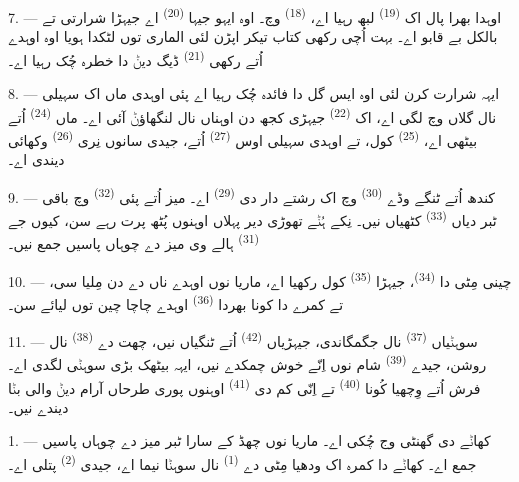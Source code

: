 \VUsaut{5.0mm}
\VUsaut{3.0mm}

7. --- اوہدا بھرا پال اک  \textsuperscript{(19)} لبھ رہیا اے،
 \textsuperscript{(18)} وچ۔ اوہ ایہو جیہا 
\textsuperscript{(20)} اے جیہڑا شرارتی تے بالکل بے قابو اے۔ بہت اُچی رکھی کتاب تیکر
اپڑن لئی الماری توں لٹکدا ہویا اوہ اوہدے اُتے رکھی 
\textsuperscript{(21)} ڈیگ دیݨ دا خطرہ چُک رہیا اے۔

8. --- ایہہ شرارت کرن لئی اوہ ایس گل دا فائدہ چُک رہیا اے پئی اوہدی ماں اک سہیلی
نال گلاں وچ لگی اے، اک  \textsuperscript{(22)} جیہڑی کجھ دن اوہناں نال
لنگھاؤݨ آئی اے۔ ماں  \textsuperscript{(24)} اُتے بیٹھی اے،
 \textsuperscript{(25)} کول، تے اوہدی سہیلی اوس 
\textsuperscript{(27)} اُتے، جیدی سانوں نِری  \textsuperscript{(26)}
وکھائی دیندی اے۔

9. --- کندھ اُتے ٹنگے وڈے  \textsuperscript{(30)} وچ اک رشتے دار دی
 \textsuperscript{(29)} اے۔ میز اُتے پئی 
\textsuperscript{(32)} وچ باقی ٹبر دیاں  \textsuperscript{(33)}
کٹھیاں نیں۔ نِکے ہُݨے تھوڑی دیر پہلاں اوہنوں پُٹھ پرت رہے سن، کیوں جے
 \textsuperscript{(31)} ہالے وی میز دے چوہاں پاسیں جمع نیں۔

10. --- چینی مِٹی دا  \textsuperscript{(34)}، جیہڑا
 \textsuperscript{(35)} کول رکھیا اے، ماریا نوں اوہدے ناں
دے دن مِلیا سی، تے کمرے دا کونا بھردا 
\textsuperscript{(36)} اوہدے چاچا چین توں لیائے سن۔

11. --- سوہݨیاں  \textsuperscript{(37)} نال جگمگاندی، جیہڑیاں
 \textsuperscript{(42)} اُتے ٹنگیاں نیں، چھت دے 
\textsuperscript{(38)} نال روشن، جیدے  \textsuperscript{(39)}
شام نوں اِنّے خوش چمکدے نیں، ایہہ بیٹھک بڑی سوہݨی لگدی اے۔ فرش اُتے وِچھیا کُونا
 \textsuperscript{(40)} تے اِنّی کم دی 
\textsuperscript{(41)} اوہنوں پوری طرحاں آرام دیݨ والی بݨا دیندے نیں۔

\VUsaut{3.6mm}
\VUsaut{3.0mm}

1. --- کھاݨے دی گھنٹی وج چُکی اے۔ ماریا نوں چھڈ کے سارا ٹبر میز دے چوہاں پاسیں
جمع اے۔ کھاݨے دا کمرہ اک ودھیا مِٹی دے  \textsuperscript{(1)} نال
سوہݨا نیما اے، جیدی  \textsuperscript{(2)} پتلی اے۔

